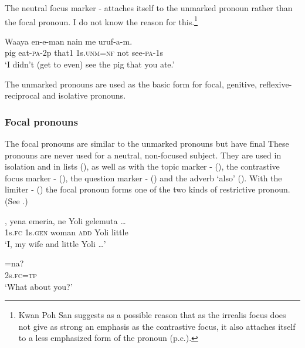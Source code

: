 The neutral focus marker - attaches itself to the unmarked pronoun rather than the focal pronoun. I do not know the reason for this.\footnote{Kwan Poh San suggests as a possible reason that as the irrealis focus does not give as strong an emphasis as the contrastive focus, it also attaches itself to a less emphasized form of the pronoun (p.c.).}

\ea%
\label{ex:x547}
\gll Waaya en-e-man nain  me uruf-a-m. \\
pig eat-\textsc{pa}-2p that1 1s.\textsc{unm}=\textsc{nf} not see-\textsc{pa}-1s \\
\glt`I didn't (get to even) see the pig that you ate.'
\z

The unmarked pronouns are used as the basic form for focal, genitive, reflexive-reciprocal and isolative pronouns.

\subsubsection[Focal pronouns]{Focal pronouns}
{}
The focal pronouns are similar to the unmarked pronouns but have final  These pronouns are never used for a neutral, non-focused subject. They are used in isolation and in lists (), as well as with the topic marker - (), the contrastive focus marker - (), the question marker - () and the adverb  `also' (). With the limiter - () the focal pronoun forms one of the two kinds of restrictive pronoun. (See .)

\ea%
\label{ex:x541}
\gll {}, yena emeria, ne Yoli gelemuta {\dots} \\
1s.\textsc{fc} 1s.\textsc{gen} woman \textsc{add} Yoli little\\
\glt`I, my wife and little Yoli {\dots}'
\z

\ea%
\label{ex:x542}
\gll {}=na? \\
2s.\textsc{fc}=\textsc{tp}\\
\glt`What about you?'
\z

